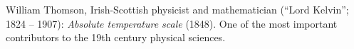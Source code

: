 \begin{frame}
\begin{columns}
\begin{column}{0.5cm}
\vspace*{-0.2cm}
\end{column}
\begin{column}{7cm}
\otext

William Thomson, Irish-Scottish physicist and mathematician (``Lord Kelvin'';
1824 -- 1907): \textit{Absolute temperature scale} (1848). One of the most important
contributors to the 19th century physical sciences.\\
\end{column}
\end{columns}

\end{frame}

\scriptsize












